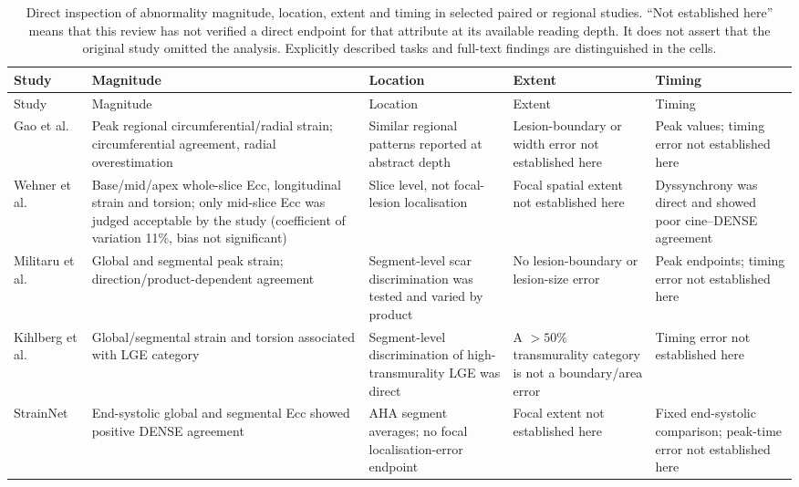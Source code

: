 {\scriptsize\sloppy
\begin{longtable}{L{0.13\textwidth}L{0.19\textwidth}L{0.18\textwidth}L{0.17\textwidth}L{0.17\textwidth}}
\caption{Direct inspection of abnormality magnitude, location, extent and timing in selected paired or regional studies. ``Not established here'' means that this review has not verified a direct endpoint for that attribute at its available reading depth. It does not assert that the original study omitted the analysis. Explicitly described tasks and full-text findings are distinguished in the cells.}\label{tab:attributes}\\
\toprule
Study & Magnitude & Location & Extent & Timing \\
\midrule
\endfirsthead
\toprule
Study & Magnitude & Location & Extent & Timing \\
\midrule
\endhead
Gao et al.~\cite{gao2014cine} & Peak regional circumferential/radial strain; circumferential agreement, radial overestimation & Similar regional patterns reported at abstract depth & Lesion-boundary or width error not established here & Peak values; timing error not established here \\
\addlinespace
Wehner et al.~\cite{wehner2018} & Base/mid/apex whole-slice Ecc, longitudinal strain and torsion; only mid-slice Ecc was judged acceptable by the study (coefficient of variation 11\%, bias not significant) & Slice level, not focal-lesion localisation & Focal spatial extent not established here & Dyssynchrony was direct and showed poor cine--DENSE agreement \\
\addlinespace
Militaru et al.~\cite{militaru2021} & Global and segmental peak strain; direction/product-dependent agreement & Segment-level scar discrimination was tested and varied by product & No lesion-boundary or lesion-size error & Peak endpoints; timing error not established here \\
\addlinespace
Kihlberg et al.~\cite{kihlberg2020clinical} & Global/segmental strain and torsion associated with LGE category & Segment-level discrimination of high-transmurality LGE was direct & A \(>50\%\) transmurality category is not a boundary/area error & Timing error not established here \\
\addlinespace
StrainNet~\cite{wang2023strainnet} & End-systolic global and segmental Ecc showed positive DENSE agreement & AHA segment averages; no focal localisation-error endpoint & Focal extent not established here & Fixed end-systolic comparison; peak-time error not established here \\

\end{longtable}}
